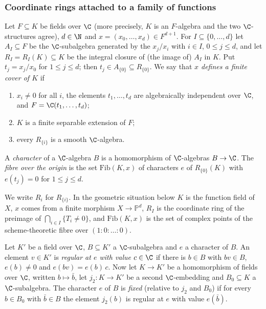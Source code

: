 \subsubsection{Coordinate rings attached to a family of functions}

\begin{definition}\label{pf:hlf-cech:def:fincov}
Let $F\subseteq K$ be fields over $\C$ (more precisely, $K$ is an $F$-algebra and the two $\C$-structures agree), $d\in\N$ and
$x=(x_0,\dots,x_d)\in F^{d+1}$. For $I\subseteq\{0,\dots,d\}$ let $A_I\subseteq F$ be the $\C$-subalgebra generated by the $x_j/x_i$ with
$i\in I$, $0\le j\le d$, and let $R_I=R_I(K)\subseteq K$ be the integral closure of (the image of) $A_I$ in $K$. Put $t_j=x_j/x_0$ for
$1\le j\le d$; then $t_j\in A_{\{0\}}\subseteq R_{\{0\}}$. We say that \emph{$x$ defines a finite cover of $K$} if
\begin{enumerate}[label=(\roman*),nosep]
\item $x_i\ne0$ for all $i$, the elements $t_1,\dots,t_d$ are algebraically independent over $\C$, and $F=\C(t_1,\dots,t_d)$;
\item $K$ is a finite separable extension of $F$;
\item every $R_{\{i\}}$ is a smooth $\C$-algebra.
\end{enumerate}
A \emph{character} of a $\C$-algebra $B$ is a homomorphism of $\C$-algebras $B\to\C$. The \emph{fibre over the origin} is the set
$\mathrm{Fib}(K,x)$ of characters $e$ of $R_{\{0\}}(K)$ with $e(t_j)=0$ for $1\le j\le d$.
\end{definition}

We write $R_i$ for $R_{\{i\}}$. In the geometric situation below $K$ is the function field of $X$, $x$ comes from a finite morphism
$X\to\mathbb P^d$, $R_I$ is the coordinate ring of the preimage of $\bigcap_{i\in I}\{T_i\ne0\}$, and $\mathrm{Fib}(K,x)$ is the set of
complex points of the scheme-theoretic fibre over $(1:0:\dots:0)$.

\begin{definition}\label{pf:hlf-cech:def:fix}
Let $K'$ be a field over $\C$, $B\subseteq K'$ a $\C$-subalgebra and $e$ a character of $B$. An element $v\in K'$ is \emph{regular at $e$ with
value $c\in\C$} if there is $b\in B$ with $bv\in B$, $e(b)\ne0$ and $e(bv)=e(b)\,c$. Now let $K\to K'$ be a homomorphism of fields over $\C$,
written $b\mapsto\bar b$, let $j_2\colon K\to K'$ be a second $\C$-embedding and $B_0\subseteq K$ a $\C$-subalgebra. The character $e$ of $B$
is \emph{fixed} (relative to $j_2$ and $B_0$) if for every $b\in B_0$ with $\bar b\in B$ the element $j_2(b)$ is regular at $e$ with value
$e(\bar b)$.
\end{definition}

